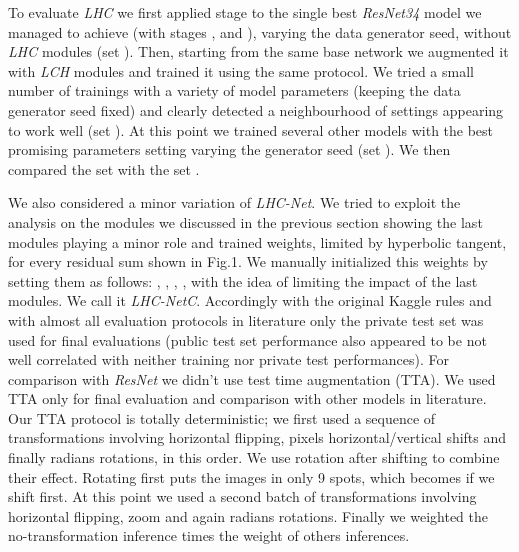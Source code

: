 \documentclass[fleqn,10pt]{SelfArx}
\begin{document}
To evaluate \textit{LHC} we first applied stage  to the single best \textit{ResNet34} model we managed to achieve (with stages ,  and ), varying the data generator seed, without \textit{LHC} modules (set ). Then, starting from the same base network we augmented it with \textit{LCH} modules and trained it using the same protocol. We tried a small number of trainings with a variety of model parameters (keeping the data generator seed fixed) and clearly detected a neighbourhood of settings appearing to work well (set ). At this point we trained several other models with the best promising parameters setting varying the generator seed (set ). We then compared the set  with the set .

We also considered a minor variation of \textit{LHC-Net}. We tried to exploit the analysis on the  modules we discussed in the previous section showing the last modules playing a minor role and trained  weights, limited by hyperbolic tangent, for every residual sum shown in Fig.1. We manually initialized this  weights by setting them as follows: , , , ,  with the idea of limiting the impact of the last  modules. We call it \textit{LHC-NetC}.
Accordingly with the original Kaggle rules and with almost all evaluation protocols in literature only the private test set was used for final evaluations (public test set performance also appeared to be not well correlated with neither training nor private test performances).
For comparison with \textit{ResNet} we didn't use test time augmentation (TTA). We used TTA only for final evaluation and comparison with other models in literature.
Our TTA protocol is totally deterministic; we first used a sequence of transformations involving horizontal flipping,  pixels horizontal/vertical shifts and finally  radians rotations, in this order. We use rotation after shifting to combine their effect. Rotating first puts the images in only 9 spots, which becomes  if we shift first. At this point we used a second batch of transformations involving horizontal flipping,  zoom and again  radians rotations. Finally we weighted the no-transformation inference  times the weight of others inferences.
\end{document}
